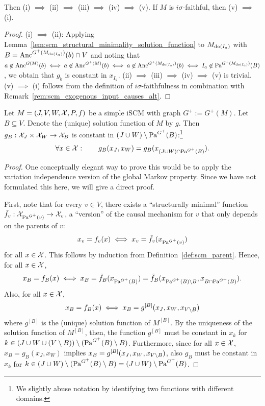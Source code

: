 {\begin{Prp}
\begin{enumerate}[label=(\roman*)]
  \end{enumerate}
  Then (i) $\implies$ (ii) $\implies$ (iii) $\implies$ (iv) $\implies$ (v).
  If $M$ is $i\sigma$-faithful, then (v) $\implies$ (i).
\end{Prp}
\begin{proof}
  (i) $\implies$ (ii):
  Applying Lemma~\ref{lem:scm_structural_minimality_solution_function} to $M_{\operatorname{do}(I_a)}$ with $B = \mathrm{Anc}^{G^+(M_{\operatorname{do}(I_a)})}(b) \cap V$ and noting that
  $a \not\in \mathrm{Anc}^{G(M)}(b) \iff a \not\in \mathrm{Anc}^{G^+(M)}(b) \iff a \not\in \mathrm{Anc}^{G^+(M_{\operatorname{do}(I_a)})}(b) \iff I_a \not\in \mathrm{Pa}^{G^+(M_{\operatorname{do}(I_a)})}(B)$, we obtain that $g_b$ is constant in $x_{I_a}$.
  (ii) $\implies$ (iii) $\implies$ (iv) $\implies$ (v) is trivial.
  (v) $\implies$ (i) follows from the definition of $i\sigma$-faithfulness in combination with Remark~\ref{rem:scm_exogenous_input_causes_alt}.
\end{proof}
}
\begin{Lem}\label{lem:scm_structural_minimality_solution_function}
  Let $M = \left ( J, V, W, \mathcal{X}, P, f \right )$ be a simple iSCM with graph $G^+ := G^+(M)$.
  Let $B \subseteq V$.
  Denote the (unique) solution function of $M$ by $g$. %
  Then $g_B : \mathcal{X}_J \times \mathcal{X}_W \to \mathcal{X}_B$ is constant in $(J \cup W) \setminus \mathrm{Pa}^{G^+}(B)$:\footnote{We slightly abuse notation by
  identifying two functions with different domains.}
    $$\forall x \in \mathcal{X}: \qquad g_B(x_J,x_W) = g_B(x_{(J \cup W) \cap \mathrm{Pa}^{G^+}(B)}).$$
\end{Lem}
\begin{proof}
  One conceptually elegant way to prove this would be to apply the variation independence version of the global Markov property.
  Since we have not formulated this here, we will give a direct proof.

  First, note that for every $v \in V$, there exists a ``structurally minimal'' function 
  $\tilde{f}_v : \mathcal{X}_{\mathrm{Pa}^{G^+}(v)} \to \mathcal{X}_v$, a ``version'' of the causal mechanism for $v$ that only depends on the parents of $v$:
  $$x_v = f_v(x) \iff x_v = \tilde{f}_v(x_{\mathrm{Pa}^{G^+}(v)})$$
  for all $x \in \mathcal{X}$. 
  This follows by induction from Definition~\ref{def:scm_parent}.
  Hence, for all $x \in \mathcal{X}$,
  $$x_B = f_B(x) \iff x_B = \tilde{f}_B(x_{\mathrm{Pa}^{G^+}(B)}) = \tilde{f}_B(x_{\mathrm{Pa}^{G^+}(B) \setminus B},x_{B \cap \mathrm{Pa}^{G^+}(B)}).$$
  Also, for all $x \in \mathcal{X}$,
  $$x_B = f_B(x) \iff x_B = g^{[B]}(x_J,x_W,x_{V \setminus B})$$
  where $g^{[B]}$ is the (unique) solution function of $M^{[B]}$.
  By the uniqueness of the solution function of $M^{[B]}$, then, the function $g^{[B]}$ must be constant in $x_k$ for $k \in (J \cup W \cup (V \setminus B)) \setminus (\mathrm{Pa}^{G^+}(B) \setminus B)$.
  Furthermore, since for all $x \in \mathcal{X}$, $x_B = g_B(x_J,x_W)$ implies $x_B = g^{[B]}(x_J,x_W,x_{V \setminus B})$, also $g_B$ must be constant in $x_k$ for $k \in (J \cup W) \setminus (\mathrm{Pa}^{G^+}(B) \setminus B) = (J \cup W) \setminus \mathrm{Pa}^{G^+}(B)$.
\end{proof}
